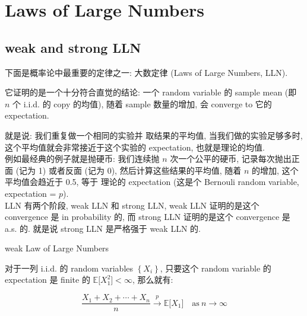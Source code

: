 \documentclass{qlnotes-export}
\begin{document}
\section{Laws of Large Numbers}\label{laws-of-large-numbers}

\subsection{weak and strong LLN}\label{weak-and-strong-lln}

下面是概率论中最重要的定律之一: 大数定律 (Laws of Large Numbers, LLN).

它证明的是一个十分符合直觉的结论: 一个 random variable 的 sample mean (即 \(n\) 个 i.i.d. 的 copy 的均值), 随着 sample 数量的增加, 会 converge to 它的 expectation.

就是说: 我们重复做一个相同的实验并 取结果的平均值, 当我们做的实验足够多时, 这个平均值就会非常接近于这个实验的 expectation, 也就是理论的均值.\\
例如最经典的例子就是抛硬币: 我们连续抛 \(n\) 次一个公平的硬币, 记录每次抛出正面 (记为 1) 或者反面 (记为 0), 然后计算这些结果的平均值, 随着 \(n\) 的增加, 这个平均值会趋近于 0.5, 等于 理论的 expectation (这是个 Bernouli random variable, expectation = \(p\)).\\
LLN 有两个阶段, weak LLN 和 strong LLN, weak LLN 证明的是这个 convergence 是 in probability 的, 而 strong LLN 证明的是这个 convergence 是 a.s. 的. 就是说 strong LLN 是严格强于 weak LLN 的.

\begin{theorem}{weak Law of Large Numbers}\label{thm-04-lln-weak-law-of-large-numbers}

对于一列 i.i.d. 的 random variables \(\left\{ X_{i} \right\}\), 只要这个 random variable 的 expectation 是 finite 的 \({\mathbb{E}}\lbrack X_{1}^{2}\rbrack < \infty\), 那么就有:

\[\frac{X_{1} + X_{2} + \cdots + X_{n}}{n}\overset{p}{\rightarrow}{\mathbb{E}}\lbrack X_{1}\rbrack\quad\text{as}\ n\rightarrow\infty\]

\end{theorem}
\end{document}
